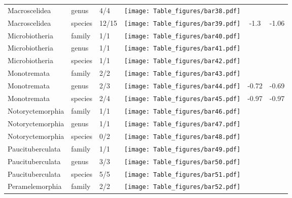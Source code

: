 \begin{longtable}{lL{1.8cm}C{2cm}lcc}
  Macroscelidea & genus & 4/4 & \texttt{[image: Table\_figures/bar38.pdf]} &   &   \\ 
  Macroscelidea & species & 12/15 & \texttt{[image: Table\_figures/bar39.pdf]} & -1.3 & -1.06 \\ 
  Microbiotheria & family & 1/1 & \texttt{[image: Table\_figures/bar40.pdf]} &   &   \\ 
  Microbiotheria & genus & 1/1 & \texttt{[image: Table\_figures/bar41.pdf]} &   &   \\ 
  Microbiotheria & species & 1/1 & \texttt{[image: Table\_figures/bar42.pdf]} &   &   \\ 
  Monotremata & family & 2/2 & \texttt{[image: Table\_figures/bar43.pdf]} &   &   \\ 
  Monotremata & genus & 2/3 & \texttt{[image: Table\_figures/bar44.pdf]} & -0.72 & -0.69 \\ 
  Monotremata & species & 2/4 & \texttt{[image: Table\_figures/bar45.pdf]} & -0.97 & -0.97 \\ 
  Notoryctemorphia & family & 1/1 & \texttt{[image: Table\_figures/bar46.pdf]} &   &   \\ 
  Notoryctemorphia & genus & 1/1 & \texttt{[image: Table\_figures/bar47.pdf]} &   &   \\ 
  Notoryctemorphia & species & 0/2 & \texttt{[image: Table\_figures/bar48.pdf]} &   &   \\ 
  Paucituberculata & family & 1/1 & \texttt{[image: Table\_figures/bar49.pdf]} &   &   \\ 
  Paucituberculata & genus & 3/3 & \texttt{[image: Table\_figures/bar50.pdf]} &   &   \\ 
  Paucituberculata & species & 5/5 & \texttt{[image: Table\_figures/bar51.pdf]} &   &   \\ 
  Peramelemorphia & family & 2/2 & \texttt{[image: Table\_figures/bar52.pdf]} &   &   \\ 

\end{longtable}
